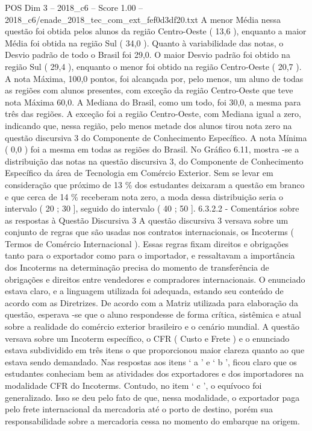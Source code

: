 \begin{textsample}{POS Dim 3 – 2018\_c6 – Score 1.00 – 2018\_c6/enade\_2018\_tec\_com\_ext\_fef0d3df20.txt}
A menor Média nessa questão foi obtida pelos alunos da região Centro-Oeste ( 13,6 ), enquanto a maior Média foi obtida na região Sul ( 34,0 ).
Quanto à variabilidade das notas, o Desvio padrão de todo o Brasil foi 29,0.
O maior Desvio padrão foi obtido na região Sul ( 29,4 ), enquanto o menor foi obtido na região Centro-Oeste ( 20,7 ).
A nota Máxima, 100,0 pontos, foi alcançada por, pelo menos, um aluno de todas as regiões com alunos presentes, com exceção da região Centro-Oeste que teve nota Máxima 60,0.
A Mediana do Brasil, como um todo, foi 30,0, a mesma para três das regiões.
A exceção foi a região Centro-Oeste, com Mediana igual a zero, indicando que, nessa região, pelo menos metade dos alunos tirou nota zero na questão discursiva 3 do Componente de Conhecimento Específico.
A nota Mínima ( 0,0 ) foi a mesma em todas as regiões do Brasil.
No Gráfico 6.11, mostra -se a distribuição das notas na questão discursiva 3, do Componente de Conhecimento Específico da área de Tecnologia em Comércio Exterior.
Sem se levar em consideração que próximo de 13 \% dos estudantes deixaram a questão em branco e que cerca de 14 \% receberam nota zero, a moda dessa distribuição seria o intervalo ( 20 ; 30 ], seguido do intervalo ( 40 ; 50 ]. 6.3.2.2 - Comentários sobre as respostas à Questão Discursiva 3 A questão discursiva 3 versava sobre um conjunto de regras que são usadas nos contratos internacionais, os Incoterms ( Termos de Comércio Internacional ).
Essas regras fixam direitos e obrigações tanto para o exportador como para o importador, e ressaltavam a importância dos Incoterms na determinação precisa do momento de transferência de obrigações e direitos entre vendedores e compradores internacionais.
O enunciado estava claro, e a linguagem utilizada foi adequada, estando seu conteúdo de acordo com as Diretrizes.
De acordo com a Matriz utilizada para elaboração da questão, esperava -se que o aluno respondesse de forma crítica, sistêmica e atual sobre a realidade do comércio exterior brasileiro e o cenário mundial.
A questão versava sobre um Incoterm específico, o CFR ( Custo e Frete ) e o enunciado estava subdividido em três itens o que proporcionou maior clareza quanto ao que estava sendo demandado.
Nas respostas aos itens ‘ a ’ e ‘ b ’, ficou claro que os estudantes conheciam bem as atividades dos exportadores e dos importadores na modalidade CFR do Incoterms.
Contudo, no item ‘ c ’, o equívoco foi generalizado.
Isso se deu pelo fato de que, nessa modalidade, o exportador paga pelo frete internacional da mercadoria até o porto de destino, porém sua responsabilidade sobre a mercadoria cessa no momento do embarque na origem.

\end{textsample}
